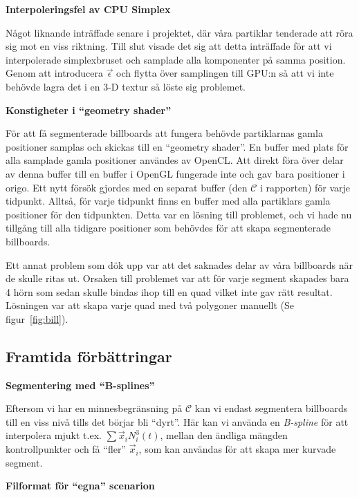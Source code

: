 \documentclass[a4paper]{article}
\begin{document}
\begin{multicols}{2}
            \textbf{Interpoleringsfel av CPU Simplex}

            Något liknande inträffade senare i projektet, där våra partiklar tenderade att röra sig mot en viss riktning. Till slut visade det sig att detta inträffade för att vi interpolerade simplexbruset och samplade alla komponenter på samma position. Genom att introducera $\vec{\epsilon}$ och flytta över samplingen till GPU:n så att vi inte behövde lagra det i en 3-D textur så löste sig problemet.

            \textbf{Konstigheter i ``geometry shader''}
            
            För att få segmenterade billboards att fungera behövde partiklarnas gamla positioner samplas och skickas till en ``geometry shader''. En buffer med plats för alla samplade gamla positioner användes av OpenCL. Att direkt föra över delar av denna buffer till en buffer i OpenGL fungerade inte och gav bara positioner i origo. Ett nytt försök gjordes med en separat buffer (den \(\mathcal{C}\) i rapporten) för varje tidpunkt. Alltså, för varje tidpunkt finns en buffer med alla partiklars gamla positioner för den tidpunkten. Detta var en lösning till problemet, och vi hade nu tillgång till alla tidigare positioner som behövdes för att skapa segmenterade billboards.
            
            Ett annat problem som dök upp var att det saknades delar av våra billboards när de skulle ritas ut. Orsaken till problemet var att för varje segment skapades bara 4 hörn som sedan skulle bindas ihop till en quad vilket inte gav rätt resultat. Lösningen var att skapa varje quad med två polygoner manuellt (Se figur~\ref{fig:bill}). 

        \subsection{Framtida förbättringar}
        
            \textbf{Segmentering med ``B-splines''}

            Eftersom vi har en minnesbegränsning på \(\mathcal{C}\) kan vi endast segmentera billboards till en viss nivå tills det börjar bli ``dyrt''. Här kan vi använda en \emph{B-spline} för att interpolera mjukt t.ex. \(\sum \vec{x}_i N^3_i(t)\), mellan den ändliga mängden kontrollpunkter och få ``fler'' \(\vec{x}_i\), som kan användas för att skapa mer kurvade segment.

            \textbf{Filformat för ``egna'' scenarion}


\end{multicols}
\end{document}
